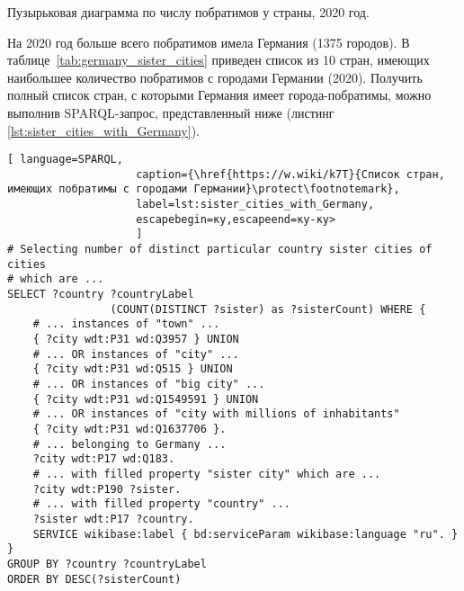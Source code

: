 \begin{marginfigure}[0.0cm]
{
\setlength{\fboxsep}{0pt}%
\setlength{\fboxrule}{1pt}%
%
}
  \caption{Пузырьковая диаграмма по числу побратимов у страны, 2020 год.}%
  \label{fig:Bubble_countries_sister_cities}%
\end{marginfigure}

На 2020 год больше всего побратимов имела Германия (\num{1375} городов). В таблице~\ref{tab:germany_sister_cities} приведен список из 10 стран, имеющих наибольшее количество побратимов с городами Германии (2020). Получить полный список стран, с которыми Германия имеет города-побратимы, можно выполнив SPARQL-запрос, представленный ниже (листинг \ref{lst:sister_cities_with_Germany}).

\begin{lstlisting}[ language=SPARQL, 
                    caption={\href{https://w.wiki/k7T}{Список стран, имеющих побратимы с городами Германии}\protect\footnotemark},
                    label=lst:sister_cities_with_Germany, 
                    escapebegin=ку,escapeend=ку-ку>
                    ]
# Selecting number of distinct particular country sister cities of cities 
# which are ...
SELECT ?country ?countryLabel 
				(COUNT(DISTINCT ?sister) as ?sisterCount) WHERE {  
	# ... instances of "town" ...                                                                    
	{ ?city wdt:P31 wd:Q3957 } UNION   
	# ... OR instances of "city" ...                                  
	{ ?city wdt:P31 wd:Q515 } UNION   
	# ... OR instances of "big city" ...                                   
	{ ?city wdt:P31 wd:Q1549591 } UNION  
	# ... OR instances of "city with millions of inhabitants"                                
	{ ?city wdt:P31 wd:Q1637706 }.    
	# ... belonging to Germany ...                                  
	?city wdt:P17 wd:Q183. 
	# ... with filled property "sister city" which are ...                                               
	?city wdt:P190 ?sister.    
	# ... with filled property "country" ...                                         
	?sister wdt:P17 ?country.                                            
	SERVICE wikibase:label { bd:serviceParam wikibase:language "ru". }
}
GROUP BY ?country ?countryLabel
ORDER BY DESC(?sisterCount)\end{lstlisting}

